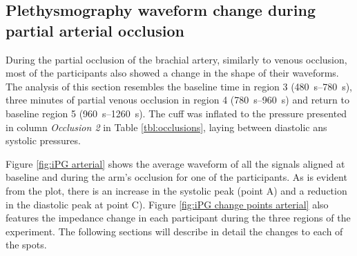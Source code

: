 \subsection{Plethysmography waveform change during partial arterial occlusion}
\label{section apa 3.2}
During the partial occlusion of the brachial artery, similarly to venous occlusion, most of the participants also showed a change in the shape of their waveforms. The analysis of this section resembles the baseline time in region 3 (\SIrange{480}{780}{\second}), three minutes of partial venous occlusion in region 4 (\SIrange{780}{960}{\second}) and return to baseline region 5 (\SIrange{960}{1260}{\second}). The cuff was inflated to the pressure presented in column \textit{Occlusion 2} in Table \ref{tbl:occlusions}, laying between diastolic ans systolic pressures. 

Figure \ref{fig:iPG arterial} shows the average waveform of all the signals aligned at baseline and during the arm's occlusion for one of the participants. As is evident from the plot, there is an increase in the systolic peak (point A) and a reduction in the diastolic peak at point C). Figure \ref{fig:iPG change points arterial} also features the impedance change in each participant during the three regions of the experiment. The following sections will describe in detail the changes to each of the spots. 

